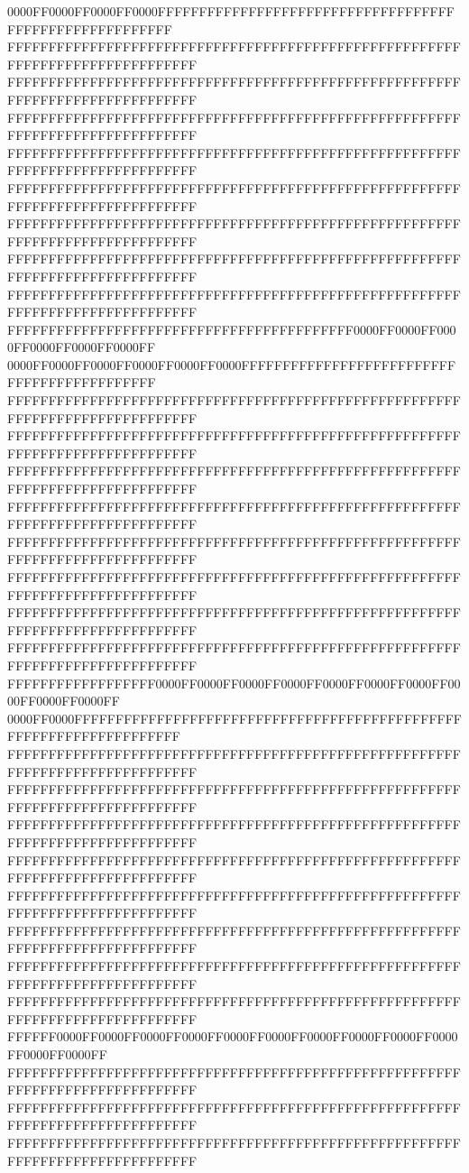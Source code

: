 0000FF0000FF0000FF0000FFFFFFFFFFFFFFFFFFFFFFFFFFFFFFFFFFFFFFFFFFFFFFFFFFFFFFFF
FFFFFFFFFFFFFFFFFFFFFFFFFFFFFFFFFFFFFFFFFFFFFFFFFFFFFFFFFFFFFFFFFFFFFFFFFFFFFF
FFFFFFFFFFFFFFFFFFFFFFFFFFFFFFFFFFFFFFFFFFFFFFFFFFFFFFFFFFFFFFFFFFFFFFFFFFFFFF
FFFFFFFFFFFFFFFFFFFFFFFFFFFFFFFFFFFFFFFFFFFFFFFFFFFFFFFFFFFFFFFFFFFFFFFFFFFFFF
FFFFFFFFFFFFFFFFFFFFFFFFFFFFFFFFFFFFFFFFFFFFFFFFFFFFFFFFFFFFFFFFFFFFFFFFFFFFFF
FFFFFFFFFFFFFFFFFFFFFFFFFFFFFFFFFFFFFFFFFFFFFFFFFFFFFFFFFFFFFFFFFFFFFFFFFFFFFF
FFFFFFFFFFFFFFFFFFFFFFFFFFFFFFFFFFFFFFFFFFFFFFFFFFFFFFFFFFFFFFFFFFFFFFFFFFFFFF
FFFFFFFFFFFFFFFFFFFFFFFFFFFFFFFFFFFFFFFFFFFFFFFFFFFFFFFFFFFFFFFFFFFFFFFFFFFFFF
FFFFFFFFFFFFFFFFFFFFFFFFFFFFFFFFFFFFFFFFFFFFFFFFFFFFFFFFFFFFFFFFFFFFFFFFFFFFFF
FFFFFFFFFFFFFFFFFFFFFFFFFFFFFFFFFFFFFFFFFF0000FF0000FF0000FF0000FF0000FF0000FF
0000FF0000FF0000FF0000FF0000FF0000FFFFFFFFFFFFFFFFFFFFFFFFFFFFFFFFFFFFFFFFFFFF
FFFFFFFFFFFFFFFFFFFFFFFFFFFFFFFFFFFFFFFFFFFFFFFFFFFFFFFFFFFFFFFFFFFFFFFFFFFFFF
FFFFFFFFFFFFFFFFFFFFFFFFFFFFFFFFFFFFFFFFFFFFFFFFFFFFFFFFFFFFFFFFFFFFFFFFFFFFFF
FFFFFFFFFFFFFFFFFFFFFFFFFFFFFFFFFFFFFFFFFFFFFFFFFFFFFFFFFFFFFFFFFFFFFFFFFFFFFF
FFFFFFFFFFFFFFFFFFFFFFFFFFFFFFFFFFFFFFFFFFFFFFFFFFFFFFFFFFFFFFFFFFFFFFFFFFFFFF
FFFFFFFFFFFFFFFFFFFFFFFFFFFFFFFFFFFFFFFFFFFFFFFFFFFFFFFFFFFFFFFFFFFFFFFFFFFFFF
FFFFFFFFFFFFFFFFFFFFFFFFFFFFFFFFFFFFFFFFFFFFFFFFFFFFFFFFFFFFFFFFFFFFFFFFFFFFFF
FFFFFFFFFFFFFFFFFFFFFFFFFFFFFFFFFFFFFFFFFFFFFFFFFFFFFFFFFFFFFFFFFFFFFFFFFFFFFF
FFFFFFFFFFFFFFFFFFFFFFFFFFFFFFFFFFFFFFFFFFFFFFFFFFFFFFFFFFFFFFFFFFFFFFFFFFFFFF
FFFFFFFFFFFFFFFFFF0000FF0000FF0000FF0000FF0000FF0000FF0000FF0000FF0000FF0000FF
0000FF0000FFFFFFFFFFFFFFFFFFFFFFFFFFFFFFFFFFFFFFFFFFFFFFFFFFFFFFFFFFFFFFFFFFFF
FFFFFFFFFFFFFFFFFFFFFFFFFFFFFFFFFFFFFFFFFFFFFFFFFFFFFFFFFFFFFFFFFFFFFFFFFFFFFF
FFFFFFFFFFFFFFFFFFFFFFFFFFFFFFFFFFFFFFFFFFFFFFFFFFFFFFFFFFFFFFFFFFFFFFFFFFFFFF
FFFFFFFFFFFFFFFFFFFFFFFFFFFFFFFFFFFFFFFFFFFFFFFFFFFFFFFFFFFFFFFFFFFFFFFFFFFFFF
FFFFFFFFFFFFFFFFFFFFFFFFFFFFFFFFFFFFFFFFFFFFFFFFFFFFFFFFFFFFFFFFFFFFFFFFFFFFFF
FFFFFFFFFFFFFFFFFFFFFFFFFFFFFFFFFFFFFFFFFFFFFFFFFFFFFFFFFFFFFFFFFFFFFFFFFFFFFF
FFFFFFFFFFFFFFFFFFFFFFFFFFFFFFFFFFFFFFFFFFFFFFFFFFFFFFFFFFFFFFFFFFFFFFFFFFFFFF
FFFFFFFFFFFFFFFFFFFFFFFFFFFFFFFFFFFFFFFFFFFFFFFFFFFFFFFFFFFFFFFFFFFFFFFFFFFFFF
FFFFFFFFFFFFFFFFFFFFFFFFFFFFFFFFFFFFFFFFFFFFFFFFFFFFFFFFFFFFFFFFFFFFFFFFFFFFFF
FFFFFF0000FF0000FF0000FF0000FF0000FF0000FF0000FF0000FF0000FF0000FF0000FF0000FF
FFFFFFFFFFFFFFFFFFFFFFFFFFFFFFFFFFFFFFFFFFFFFFFFFFFFFFFFFFFFFFFFFFFFFFFFFFFFFF
FFFFFFFFFFFFFFFFFFFFFFFFFFFFFFFFFFFFFFFFFFFFFFFFFFFFFFFFFFFFFFFFFFFFFFFFFFFFFF
FFFFFFFFFFFFFFFFFFFFFFFFFFFFFFFFFFFFFFFFFFFFFFFFFFFFFFFFFFFFFFFFFFFFFFFFFFFFFF

